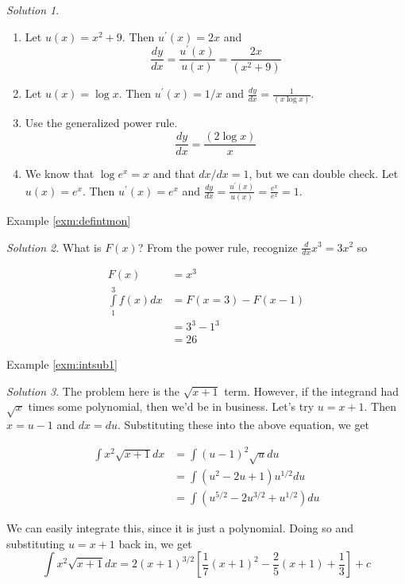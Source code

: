 \documentclass[
]{book}
\providecommand{\tightlist}{%
  \setlength{\itemsep}{0pt}\setlength{\parskip}{0pt}}
\theoremstyle{definition}
\theoremstyle{definition}
\theoremstyle{definition}
\theoremstyle{remark}
\newtheorem*{solution}{Solution}
\begin{document}
\begin{solution}
{}

\begin{enumerate}
\def\labelenumi{\arabic{enumi}.}
\tightlist
\item
  Let \(u(x)=x^2+9\). Then \(u^\prime(x)=2x\) and \[\frac{dy}{dx}= \frac{u^\prime(x)}{u(x)} = \frac{2x}{(x^2+9)}\]
\item
  Let \(u(x)=\log x\). Then \(u^\prime(x)=1/x\) and \(\frac{dy}{dx} = \frac{1}{(x\log x)}\).
\item
  Use the generalized power rule. \[\frac{dy}{dx} = \frac{(2 \log x)}{x}\]
\item
  We know that \(\log e^x=x\) and that \(dx/dx=1\), but we can double check. Let \(u(x)=e^x\). Then \(u^\prime(x)=e^x\) and \(\frac{dy}{dx} = \frac{u^\prime(x)}{u(x)} = \frac{e^x}{e^x} = 1.\)
\end{enumerate}
\end{solution}

Example \ref{exm:defintmon}

\begin{solution}
{}What is \(F(x)\)? From the power rule, recognize \(\frac{d}{dx}x^3 = 3x^2\) so

\begin{align*}
F(x) &= x^3\\
\int\limits_1^3 f(x) dx &= F(x = 3) - F(x  - 1)\\
&= 3^3 - 1^3\\
&=26
\end{align*}
\end{solution}

Example \ref{exm:intsub1}
\begin{solution}
{}The problem here is the \(\sqrt{x+1}\) term. However, if the integrand had \(\sqrt{x}\) times some polynomial, then we'd be in business. Let's try \(u=x+1\). Then \(x=u-1\) and \(dx=du\). Substituting these into the above equation, we get

\begin{align*}
            \int x^2\sqrt{x+1}dx&= \int (u-1)^2\sqrt{u}du\\
            &= \int (u^2-2u+1)u^{1/2}du\\
            &= \int (u^{5/2}-2u^{3/2}+u^{1/2})du
\end{align*}

We can easily integrate this, since it is just a polynomial. Doing so and substituting \(u=x+1\) back in, we get \[\int x^2\sqrt{x+1}dx=2(x+1)^{3/2}\left[\frac{1}{7}(x+1)^2 -
\frac{2}{5}(x+1)+\frac{1}{3}\right]+c\]
\end{solution}
\end{document}
